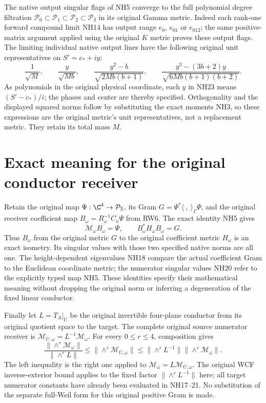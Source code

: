 The native output singular flags of NH5 converge to the full
polynomial degree filtration $\mathcal P_0\subset\mathcal P_1
\subset\mathcal P_2\subset\mathcal P_3$ in its original
Gamma metric. Indeed each rank-one forward compound limit
NH14 has output range $e_0$, $e_{01}$ or $e_{012}$; the
same positive-matrix argument applied using the original
$K$ metric proves these output flags. The limiting individual
native output lines have the following original unit
representatives on $S'=c_*+iy$:
\[
 \frac1{\sqrt M},\qquad
 \frac{y}{\sqrt{Mb}},\qquad
 \frac{y^2-b}{\sqrt{2Mb(b+1)}},\qquad
 \frac{y^3-(3b+2)y}{\sqrt{6Mb(b+1)(b+2)}}.
 \tag{NH23}
\]
As polynomials in the original physical coordinate, each $y$
in NH23 means $(S'-c_*)/i$; the phases and center are thereby
specified. Orthogonality and the displayed squared norms
follow by substituting the exact moments NH3, so these
expressions are the original metric's unit representatives,
not a replacement metric. They retain its total mass $M$.

\section{Exact meaning for the original conductor receiver}
Retain the original map $\Psi:\C^4\to\mathcal P_3$,
its Gram $G=\Psi^*\langle\ ,\ \rangle_\Gamma\Psi$, and
the original receiver coefficient map
$B_\omega=R_\omega^{-1}C_\kappa\Psi$ from RW6. The exact
identity NH5 gives
\[
 \mathcal M_\omega B_\omega=\Psi,\qquad
 B_\omega^*H_\omega B_\omega=G.
 \tag{NH24}
\]
Thus $B_\omega$ from the original metric $G$ to the original
coefficient metric $H_\omega$ is an exact isometry. Its
singular values with those two specified native norms are
all one. The height-dependent eigenvalues NH18 compare the
actual coefficient Gram to the Euclidean coordinate metric;
the numerator singular values NH20 refer to the explicitly
typed map NH5. These identities specify their mathematical
meaning without dropping the original norm or inferring a
degeneration of the fixed linear conductor.

Finally let $L=T_A|_U$ be the original invertible four-plane
conductor from its original quotient space to the target.
The complete original source numerator receiver is
$\mathcal M_{U,\omega}=L^{-1}\mathcal M_\omega$. For every
$0\le r\le4$, composition gives
\[
 \frac{\|\wedge^r\mathcal M_\omega\|}{\|\wedge^rL\|}
 \le\|\wedge^r\mathcal M_{U,\omega}\|
 \le\|\wedge^rL^{-1}\|\|\wedge^r\mathcal M_\omega\|.
 \tag{NH25}
\]
The left inequality is the right one applied to
$\mathcal M_\omega=L\mathcal M_{U,\omega}$.
The original WCF inverse-exterior bound applies to the fixed
factor $\|\wedge^rL^{-1}\|$ here; all target numerator
constants have already been evaluated in NH17--21. No
substitution of the separate full-Weil form for this original
positive Gram is made.

